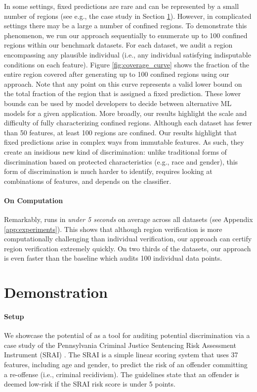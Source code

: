 In some settings, fixed predictions are rare and can be represented by a small number of regions (see e.g., the case study in Section \ref{subsec:case}). However, in complicated settings there may be a large a number of confined regions.
To demonstrate this phenomenon, we run our approach sequentially to enumerate up to 100 confined regions within our benchmark datasets. For each dataset, we audit a region encompassing any plausible individual (i.e., any individual satisfying indisputable conditions on each feature). Figure \ref{fig:coverage_curve} shows the fraction of the entire region covered after generating up to 100 confined regions using our approach. Note that any point on this curve represents a valid lower bound on the total fraction of the region that is assigned a fixed prediction. These lower bounds can be used by model developers to decide between alternative ML models for a given application. More broadly, our results highlight the scale and difficulty of fully characterizing confined regions. Although each dataset has fewer than 50 features, at least 100  regions are confined. Our results highlight that fixed predictions
arise in complex ways from immutable features. As such, they create an insidious new kind of discrimination: unlike traditional forms of discrimination based on protected characteristics (e.g., race and gender), this form of discrimination is much harder to identify, requires looking at combinations of features, and depends on the classifier.

\paragraph{On Computation}
Remarkably, \us{} runs in \emph{under 5 seconds} on average across all datasets (see Appendix \ref{app:experiments}). This shows that although region verification is more computationally challenging than individual verification, our approach can certify region verification extremely quickly. On two thirds of the datasets, our approach is even faster than the  baseline which audits 100 individual data points.

\section{Demonstration} 
\label{subsec:case}

\paragraph{Setup} We showcase the potential of \us{} as a tool for auditing potential discrimination via a case study of the Pennsylvania Criminal Justice Sentencing Risk Assessment Instrument (SRAI) \cite{PennSentence}. The SRAI is a simple linear scoring system that uses 37 features, including age and gender, to predict the risk of an offender committing a re-offense (i.e., criminal recidivism). The guidelines state that an offender is deemed low-risk if the SRAI risk score is under 5 points. %

